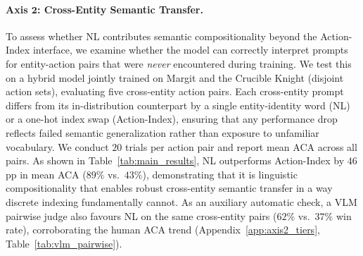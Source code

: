 \paragraph{Axis $\mathbf{2}$: Cross-Entity Semantic Transfer. }
To assess whether NL contributes semantic 
compositionality beyond the Action-Index interface, 
we examine whether the model can correctly 
interpret prompts for entity-action pairs that were
\emph{never} encountered during training. 
We test this on a hybrid model jointly trained on 
Margit and the Crucible Knight (disjoint action sets), evaluating 
five cross-entity action pairs. 
Each cross-entity 
prompt differs from its in-distribution counterpart 
by a single entity-identity word (NL) or a 
one-hot index swap (Action-Index), ensuring that 
any performance drop reflects failed semantic 
generalization rather than exposure to 
unfamiliar vocabulary. We conduct $20$ trials 
per action pair and report mean ACA across all pairs. 
As shown in Table~\ref{tab:main_results}, 
NL outperforms Action-Index by $46$\,pp in mean 
ACA ($89\%$ vs.\ $43\%$), demonstrating that 
it is linguistic compositionality that 
enables robust cross-entity semantic transfer 
in a way discrete indexing fundamentally cannot. As an auxiliary automatic check, a VLM pairwise judge also favours NL on the same cross-entity pairs ($62\%$ vs.\ $37\%$ win rate), corroborating the human ACA trend (Appendix~\ref{app:axis2_tiers}, Table~\ref{tab:vlm_pairwise}).
